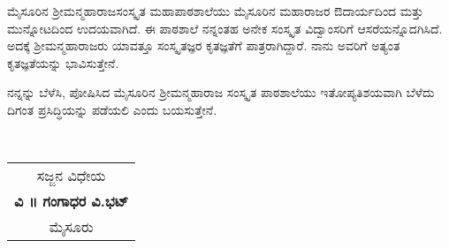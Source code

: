{ಮೈಸೂರಿನ ಶ್ರೀಮನ್ಮಹಾರಾಜಸಂಸ್ಕೃತ ಮಹಾಪಾಠಶಾಲೆಯು ಮೈಸೂರಿನ ಮಹಾರಾಜರ ಔದಾರ್ಯದಿಂದ ಮತ್ತು ಮುನ್ನೋಟದಿಂದ ಉದಯವಾಗಿದೆ. ಈ ಪಾಠಶಾಲೆ ನನ್ನಂತಹ ಅನೇಕ ಸಂಸ್ಕೃತ ವಿದ್ವಾಂಸರಿಗೆ ಆಸರೆಯನ್ನೊದಗಿಸಿದೆ. ಅದಕ್ಕೆ ಶ್ರೀಮನ್ಮಹಾ\-ರಾಜರು ಯಾವತ್ತೂ ಸಂಸ್ಕೃತಜ್ಞರ ಕೃತಜ್ಞತೆಗೆ ಪಾತ್ರರಾಗಿದ್ದಾರೆ. ನಾನು ಅವರಿಗೆ ಅತ್ಯಂತ ಕೃತಜ್ಞತೆಯನ್ನು ಭಾವಿಸುತ್ತೇನೆ. 

ನನ್ನನ್ನು ಬೆಳೆಸಿ, ಪೋಷಿಸಿದ ಮೈಸೂರಿನ ಶ್ರೀಮನ್ಮಹಾರಾಜ ಸಂಸ್ಕೃತ ಪಾಠ\-ಶಾಲೆಯು ಇತೋಪ್ಯತಿಶಯವಾಗಿ ಬೆಳೆದು ದಿಗಂತ ಪ್ರಸಿದ್ಧಿಯನ್ನು ಪಡೆಯಲಿ ಎಂದು ಬಯಸುತ್ತೇನೆ.  

~\hfill
\begin{tabular}{c}
ಸಜ್ಜನ ವಿಧೇಯ\\
\textbf{ವಿ ॥ ಗಂಗಾಧರ ವಿ.ಭಟ್}\\ 
ಮೈಸೂರು
\end{tabular}

\articleend
}
